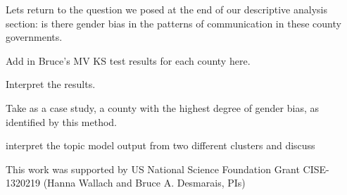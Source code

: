 \documentclass{pnastwo}
\begin{document}
\begin{article}
Lets return to the question we posed at the end of our descriptive analysis section: is there gender bias in the patterns of communication in these county governments. 
	
 Add in Bruce's MV KS test results for each county here.
	
Interpret the results.
	
	
Take as a case study, a county with the highest degree of gender bias, as identified by this method.
	
interpret the topic model output from two different clusters and discuss
	
	







\begin{acknowledgments}
This work was supported by US National Science Foundation Grant CISE-1320219 (Hanna Wallach and Bruce A. Desmarais, PIs)
\vspace{-.5cm}
\end{acknowledgments}




\end{article}
\end{document}
